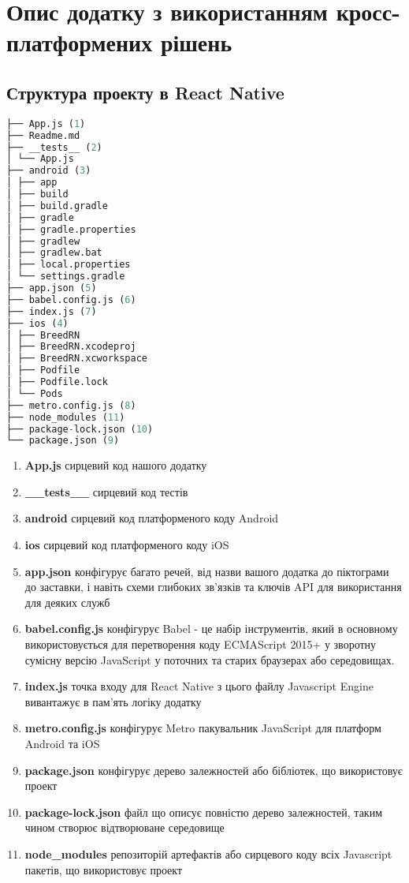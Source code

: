 \chapter{Опис додатку з використанням кросс-платформених рішень}
\label{ch2}


\section{Структура проекту в React Native}
\label{sec:rn_structure_app}

\begin{lstlisting}[style=light, language=Python,label={lst:rn_app_structure},caption=React Native App Layout]
├── App.js (1)
├── Readme.md
├── __tests__ (2)
│ └── App.js
├── android (3)
│ ├── app
│ ├── build
│ ├── build.gradle
│ ├── gradle
│ ├── gradle.properties
│ ├── gradlew
│ ├── gradlew.bat
│ ├── local.properties
│ └── settings.gradle
├── app.json (5)
├── babel.config.js (6)
├── index.js (7)
├── ios (4)
│ ├── BreedRN
│ ├── BreedRN.xcodeproj
│ ├── BreedRN.xcworkspace
│ ├── Podfile
│ ├── Podfile.lock
│ └── Pods
├── metro.config.js (8)
├── node_modules (11)
├── package-lock.json (10)
└── package.json (9)
\end{lstlisting}

\begin{enumerate}
    \item \textbf{App.js} сирцевий код нашого додатку
    \item \textbf{\_\_tests\_\_} сирцевий код тестів
    \item \textbf{android} сирцевий код платформеного коду Android
    \item \textbf{ios} сирцевий код платформеного коду iOS
    \item \textbf{app.json} конфігурує багато речей, від назви вашого додатка до піктограми до заставки, і навіть схеми глибоких зв’язків та ключів API для використання для деяких служб
    \item \textbf{babel.config.js} конфігурує Babel - це набір інструментів, який в основному використовується для перетворення коду ECMAScript 2015+ у зворотну сумісну версію JavaScript у поточних та старих браузерах або середовищах.
    \item \textbf{index.js} точка входу для React Native з цього файлу Javascript Engine вивантажує в пам'ять логіку додатку
    \item \textbf{metro.config.js} конфігурує Metro пакувальник JavaScript для платформ Android та iOS
    \item \textbf{package.json} конфігурує дерево залежностей або бібліотек, що використовує проект
    \item \textbf{package-lock.json} файл що описує повністю дерево залежностей, таким чином створює відтворюване середовище
    \item \textbf{node\_modules} репозиторій артефактів або сирцевого коду всіх Javascript пакетів, що використовує проект
\end{enumerate}


